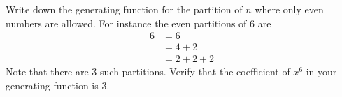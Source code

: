 Write down the generating function for the partition of $n$ where
only even numbers are allowed.
For instance the even partitions of 6 are
\begin{align*}
6
&= 6 \\
&= 4 + 2 \\
&= 2 + 2 + 2 
\end{align*}
Note that there are 3 such partitions.
Verify that the coefficient of $x^6$ in your generating function is 3.
